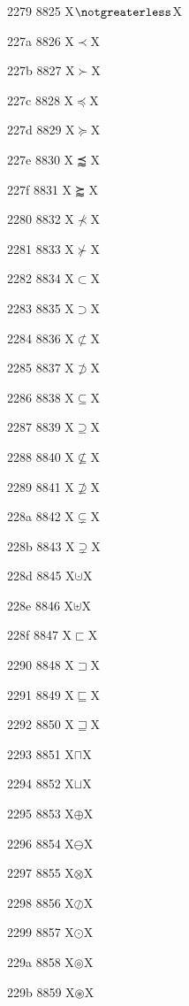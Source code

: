 \documentclass[11pt]{article}
\begin{document}
2279 8825 X{\ensuremath{\notgreaterless}}X

227a 8826 X{\ensuremath{\prec}}X

227b 8827 X{\ensuremath{\succ}}X

227c 8828 X{\ensuremath{\preccurlyeq}}X

227d 8829 X{\ensuremath{\succcurlyeq}}X

227e 8830 X{\ensuremath{\precapprox}}X

227f 8831 X{\ensuremath{\succapprox}}X

2280 8832 X{\ensuremath{\nprec}}X

2281 8833 X{\ensuremath{\nsucc}}X

2282 8834 X{\ensuremath{\subset}}X

2283 8835 X{\ensuremath{\supset}}X

2284 8836 X{\ensuremath{\nsubset}}X

2285 8837 X{\ensuremath{\nsupset}}X

2286 8838 X{\ensuremath{\subseteq}}X

2287 8839 X{\ensuremath{\supseteq}}X

2288 8840 X{\ensuremath{\nsubseteq}}X

2289 8841 X{\ensuremath{\nsupseteq}}X

228a 8842 X{\ensuremath{\subsetneq}}X

228b 8843 X{\ensuremath{\supsetneq}}X

228d 8845 X{\ensuremath{\cupdot}}X

228e 8846 X{\ensuremath{\uplus}}X

228f 8847 X{\ensuremath{\sqsubset}}X

2290 8848 X{\ensuremath{\sqsupset}}X

2291 8849 X{\ensuremath{\sqsubseteq}}X

2292 8850 X{\ensuremath{\sqsupseteq}}X

2293 8851 X{\ensuremath{\sqcap}}X

2294 8852 X{\ensuremath{\sqcup}}X

2295 8853 X{\ensuremath{\oplus}}X

2296 8854 X{\ensuremath{\ominus}}X

2297 8855 X{\ensuremath{\otimes}}X

2298 8856 X{\ensuremath{\oslash}}X

2299 8857 X{\ensuremath{\odot}}X

229a 8858 X{\ensuremath{\circledcirc}}X

229b 8859 X{\ensuremath{\circledast}}X
\end{document}
